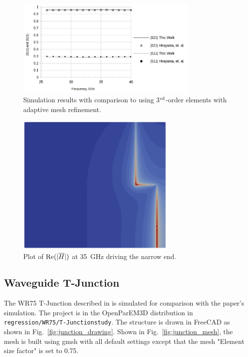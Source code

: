 \documentclass[titlepage]{article}
\renewcommand\_{\textunderscore\linebreak[1]}
\begin{document}
\begin{figure}[H]
  \centering
  \includegraphics[width=0.8\textwidth]{../regression/OpenParEM3D/slotline/step_study/screenshots/step_results}
  \caption{Simulation results with comparison to \cite{Hirayama} using 3$^{\textnormal{rd}}$-order elements with adaptive mesh refinement.}
  \label{fig:step_results}
\end{figure}

\begin{figure}[H]
  \centering
  \includegraphics[width=0.7\textwidth]{../regression/OpenParEM3D/slotline/step_study/screenshots/step_real_H}
  \caption{Plot of $\textnormal{Re}(|\overline{H}|)$ at 35~GHz driving the narrow end.}
  \label{fig:step_plot}
\end{figure}

\subsection{Waveguide T-Junction}

The WR75 T-Junction described in \cite{Alessandri} is simulated for comparison with the paper's simulation.  The project is in the OpenParEM3D distribution in \texttt{regression/WR75/T-Junction\_study}.  The structure is drawn in FreeCAD as shown in Fig.~\ref{fig:junction_drawing}.  Shown in Fig.~\ref{fig:junction_mesh}, the mesh is built using gmsh with all default settings except that the mesh "Element size factor" is set to 0.75.
\end{document}
